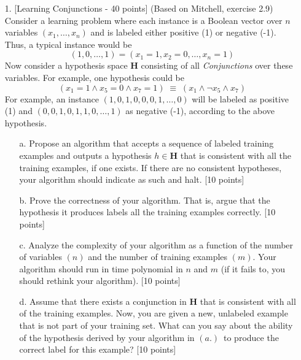 \begin{enumerate}

\item[1.] [Learning Conjunctions - 40 points] (Based on Mitchell, exercise 2.9)\\
Consider a learning problem where each instance is a Boolean vector over $n$
variables $(x_1, \ldots, x_n)$ and is labeled either positive (1) or negative
(-1).  Thus, a typical instance would be
\begin{displaymath}
(1, 0, \ldots, 1) = (x_1 = 1, x_2 = 0, \ldots, x_n = 1)
\end{displaymath}
Now consider a hypothesis space ${\mathbf H}$ consisting of all {\em
  Conjunctions} over these variables.  For example, one hypothesis
could be
\begin{displaymath}
(x_1 = 1 \land x_5 = 0 \land x_7 = 1) \; \equiv \; (x_1 \land \neg x_5 \land x_7)
\end{displaymath}
For example, an instance $(1, 0, 1, 0, 0, 0, 1, \ldots, 0)$ will be labeled
as positive (1) and $(0, 0, 1, 0, 1, 1, 0, \ldots, 1)$ as negative (-1),
according to the above hypothesis.

\begin{enumerate}
\item[a.]
Propose an algorithm that accepts a sequence of labeled training examples
and outputs a hypothesis $h \in \mathbf{H}$ that is consistent with all the training examples,
if one exists.  If there are no consistent hypotheses, your algorithm should
indicate as such and halt. [10 points]

\item[b.]
Prove the correctness of your algorithm.  That is, argue that the hypothesis
it produces labels all the training examples correctly. [10 points]

\item[c.]
Analyze the complexity of your algorithm as a function of the number of
variables $(n)$ and the number of training examples $(m)$.  Your algorithm
should run in time polynomial in $n$ and $m$ (if it fails to, you should rethink your algorithm). [10 points]

\item[d.]  Assume that there exists a conjunction in ${\mathbf H}$
  that is consistent with all of the training examples.  Now, you are
  given a new, unlabeled example that is not part of your training
  set.  What can you say about the ability of the hypothesis derived
  by your algorithm in $(a.)$~to produce the correct label for this
  example?  [10 points]
  

\end{enumerate}
\end{enumerate}
